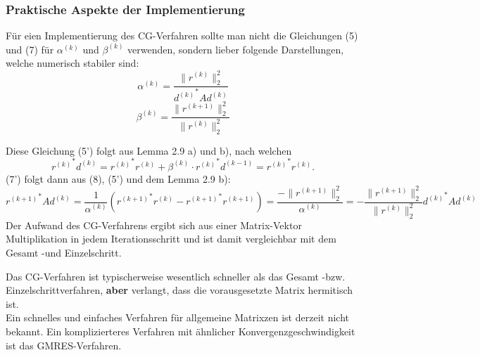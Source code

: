     \subsubsection{Praktische Aspekte der Implementierung}
    \begin{rembox}
        Für eien Implementierung des CG-Verfahren sollte man nicht die Gleichungen (5) und (7) für $\alpha^{(k)}$ 
        und $\beta^{(k)}$ verwenden, sondern lieber folgende Darstellungen, welche numerisch stabiler sind:
        \[\alpha^{(k)} = \dfrac{\|r^{(k)}\|_2^2}{{d^{(k)}}^*Ad^{(k)}} \tag{5'}\]
        \[\beta^{(k)} = \dfrac{\|r^{(k+1)}\|_2^2}{\|r^{(k)}\|_2^2} \tag{7'}\]
    \end{rembox}
    Diese Gleichung (5') folgt aus Lemma 2.9 a) und b), nach welchen
    \[{r^{(k)}}^*d^{(k)} = {r^{(k)}}^*r^{(k)} + \beta^{(k)}\cdot {r^{(k)}}^*d^{(k-1)} = {r^{(k)}}^*r^{(k)}.\]
    (7') folgt dann aus (8), (5') und dem Lemma 2.9 b):
    \[{r^{(k+1)}}^*Ad^{(k)} = \dfrac{1}{\alpha^{(k)}}\left({r^{(k+1)}}^*r^{(k)} - {r^{(k+1)}}^*r^{(k+1)}\right) 
    =\dfrac{-\|r^{(k+1)}\|_2^2}{\alpha^{(k)}} = -\dfrac{\|r^{(k+1)}\|_2^2}{\|r^{(k)}\|_2^2}{d^{(k)}}^*Ad^{(k)}\] 
    Der Aufwand des CG-Verfahrens ergibt sich aus einer Matrix-Vektor Multiplikation in jedem Iterationsschritt 
    und ist damit vergleichbar mit dem Gesamt -und Einzelschritt.
    \begin{rembox}
        Das CG-Verfahren ist typischerweise wesentlich schneller als das Gesamt -bzw. Einzelschrittverfahren, 
        \textbf{aber} verlangt, dass die vorausgesetzte Matrix hermitisch ist. \\
        Ein schnelles und einfaches Verfahren für allgemeine Matrixzen ist derzeit nicht bekannt. Ein komplizierteres 
        Verfahren mit ähnlicher Konvergenzgeschwindigkeit ist das GMRES-Verfahren. 
    \end{rembox}
